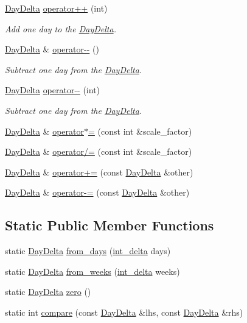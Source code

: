 \begin{DoxyCompactItemize}
\hyperlink{structDayDelta}{\-Day\-Delta} \hyperlink{structDayDelta_a6f5ca65ca16018cdf39bd5543cbec127}{operator++} (int)
\begin{DoxyCompactList}\small\item\em \-Add one day to the \hyperlink{structDayDelta}{\-Day\-Delta}. \end{DoxyCompactList}\item 
\hyperlink{structDayDelta}{\-Day\-Delta} \& \hyperlink{structDayDelta_aa0ca3c6a73df1946150a1c7e555b79b9}{operator-\/-\/} ()
\begin{DoxyCompactList}\small\item\em \-Subtract one day from the \hyperlink{structDayDelta}{\-Day\-Delta}. \end{DoxyCompactList}\item 
\hyperlink{structDayDelta}{\-Day\-Delta} \hyperlink{structDayDelta_a7e0ffb0cc2aeff7414fee2edfb8e3424}{operator-\/-\/} (int)
\begin{DoxyCompactList}\small\item\em \-Subtract one day from the \hyperlink{structDayDelta}{\-Day\-Delta}. \end{DoxyCompactList}\item 
\hyperlink{structDayDelta}{\-Day\-Delta} \& \hyperlink{structDayDelta_a4312a7090a3365dc3646f91f44ae7654}{operator$\ast$=} (const int \&scale\-\_\-factor)
\item 
\hyperlink{structDayDelta}{\-Day\-Delta} \& \hyperlink{structDayDelta_a892e28fb54b113684d1f5078d6f607c8}{operator/=} (const int \&scale\-\_\-factor)
\item 
\hyperlink{structDayDelta}{\-Day\-Delta} \& \hyperlink{structDayDelta_a081325e9acba450f7446d1d59ed65518}{operator+=} (const \hyperlink{structDayDelta}{\-Day\-Delta} \&other)
\item 
\hyperlink{structDayDelta}{\-Day\-Delta} \& \hyperlink{structDayDelta_a886f81ff8427ad7712a246fcd3b139f7}{operator-\/=} (const \hyperlink{structDayDelta}{\-Day\-Delta} \&other)
\end{DoxyCompactItemize}
\subsection*{\-Static \-Public \-Member \-Functions}
\begin{DoxyCompactItemize}
\item 
static \hyperlink{structDayDelta}{\-Day\-Delta} \hyperlink{structDayDelta_a7421a2d8448dd7d5329d72d0d6a04cbd}{from\-\_\-days} (\hyperlink{types_8h_a8a67cf99971c5cfeeaa2380ba84a4c92}{int\-\_\-delta} days)
\item 
static \hyperlink{structDayDelta}{\-Day\-Delta} \hyperlink{structDayDelta_a871bbf34275016d74c7ef8c8777c3258}{from\-\_\-weeks} (\hyperlink{types_8h_a8a67cf99971c5cfeeaa2380ba84a4c92}{int\-\_\-delta} weeks)
\item 
static \hyperlink{structDayDelta}{\-Day\-Delta} \hyperlink{structDayDelta_acfcc09473305041a930a1ea6a3c20409}{zero} ()
\item 
static int \hyperlink{structDayDelta_a1059465fe1c1bfb8d7136ad887b00d30}{compare} (const \hyperlink{structDayDelta}{\-Day\-Delta} \&lhs, const \hyperlink{structDayDelta}{\-Day\-Delta} \&rhs)
\end{DoxyCompactItemize}
